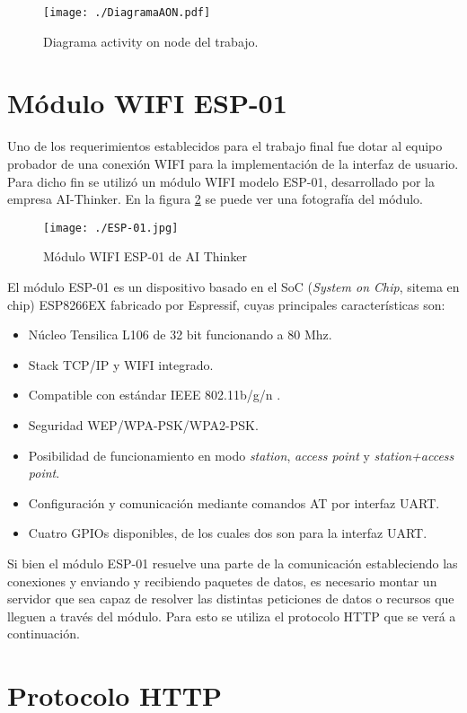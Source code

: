 \begin{figure}[H]
	\centering
	\texttt{[image: ./DiagramaAON.pdf]}
	\caption{Diagrama activity on node del trabajo.}
	\label{fig:AON}
\end{figure}

\section{Módulo WIFI ESP-01}
Uno de los requerimientos establecidos para el trabajo final fue dotar al equipo probador de una conexión WIFI para la implementación de la interfaz de usuario. Para dicho fin se utilizó un módulo WIFI modelo ESP-01, desarrollado por la empresa AI-Thinker. En la figura \ref{fig:ESP01} se puede ver una fotografía del módulo.

\begin{figure}[H]
	\centering
	\texttt{[image: ./ESP-01.jpg]}
	\caption{Módulo WIFI ESP-01 de AI Thinker}
	\label{fig:ESP01}
\end{figure}

El módulo ESP-01 es un dispositivo basado en el SoC (\emph{System on Chip}, sitema en chip) ESP8266EX fabricado por Espressif,
cuyas principales características son:
\begin{itemize}
	\item Núcleo Tensilica L106 de 32 bit funcionando a 80 Mhz.
	\item Stack TCP/IP y WIFI integrado.
	\item Compatible con estándar IEEE 802.11b/g/n .
	\item Seguridad WEP/WPA-PSK/WPA2-PSK.
	\item Posibilidad de funcionamiento en modo \emph{station}, \emph{access point} y \emph{station+access point}.
	\item Configuración y comunicación mediante comandos AT por interfaz UART.
	\item Cuatro GPIOs disponibles, de los cuales dos son para la interfaz UART.

\end{itemize}

Si bien el módulo ESP-01 resuelve una parte de la comunicación estableciendo las conexiones y enviando y recibiendo paquetes de datos, es necesario montar un servidor que sea capaz de resolver las distintas peticiones de datos o recursos que lleguen a través del módulo. Para esto se utiliza el protocolo HTTP que se verá a continuación. 

\section{Protocolo HTTP}

